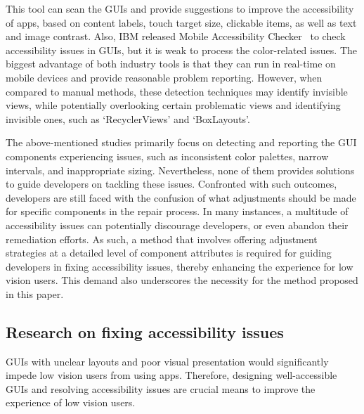 This tool can scan the GUIs and provide suggestions to improve the accessibility of apps, based on content labels, touch target size, clickable items, as well as text and image contrast.
Also, IBM released Mobile Accessibility Checker~\cite{MobileAccessibilityChecker} to check accessibility issues in GUIs, but it is weak to process the color-related issues.
The biggest advantage of both industry tools is that they can run in real-time on mobile devices and provide reasonable problem reporting.
However, when compared to manual methods, these detection techniques may identify invisible views, while potentially overlooking certain problematic views and identifying invisible ones, such as `RecyclerViews' and `BoxLayouts'.

The above-mentioned studies primarily focus on detecting and reporting the GUI components experiencing issues, such as inconsistent color palettes, narrow intervals, and inappropriate sizing.
Nevertheless, none of them provides solutions to guide developers on tackling these issues.
Confronted with such outcomes, developers are still faced with the confusion of what adjustments should be made for specific components in the repair process.
In many instances, a multitude of accessibility issues can potentially discourage developers, or even abandon their remediation efforts.
As such, a method that involves offering adjustment strategies at a detailed level of component attributes is required for guiding developers in fixing accessibility issues, thereby enhancing the experience for low vision users.
This demand also underscores the necessity for the method proposed in this paper.

\subsection{Research on fixing accessibility issues}\label{sub: research2}
GUIs with unclear layouts and poor visual presentation would significantly impede low vision users from using apps.
Therefore, designing well-accessible GUIs and resolving accessibility issues are crucial means to improve the experience of low vision users.

